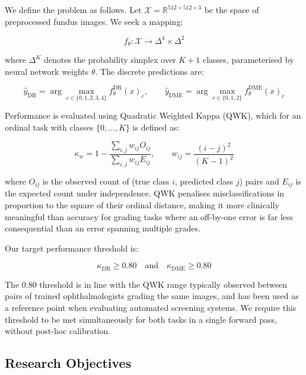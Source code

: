 \documentclass[12pt,a4paper]{article}
\begin{document}
We define the problem as follows. Let $\mathcal{X} = \mathbb{R}^{512 \times 512 \times 3}$ be the space of preprocessed fundus images. We seek a mapping:

\begin{equation}
f_\theta : \mathcal{X} \rightarrow \Delta^4 \times \Delta^2
\end{equation}

where $\Delta^K$ denotes the probability simplex over $K+1$ classes, parameterised by neural network weights $\theta$. The discrete predictions are:

\begin{equation}
\hat{y}_{\text{DR}} = \arg\max_{c \in \{0,1,2,3,4\}} f_\theta^{\text{DR}}(x)_c, \qquad \hat{y}_{\text{DME}} = \arg\max_{c \in \{0,1,2\}} f_\theta^{\text{DME}}(x)_c
\end{equation}

Performance is evaluated using Quadratic Weighted Kappa (QWK), which for an ordinal task with classes $\{0, \ldots, K\}$ is defined as:

\begin{equation}
\kappa_w = 1 - \frac{\sum_{i,j} w_{ij} O_{ij}}{\sum_{i,j} w_{ij} E_{ij}}, \qquad w_{ij} = \frac{(i-j)^2}{(K-1)^2}
\end{equation}

where $O_{ij}$ is the observed count of (true class $i$, predicted class $j$) pairs and $E_{ij}$ is the expected count under independence. QWK penalises misclassifications in proportion to the square of their ordinal distance, making it more clinically meaningful than accuracy for grading tasks where an off-by-one error is far less consequential than an error spanning multiple grades.

Our target performance threshold is:

\begin{equation}
\kappa_{\text{DR}} \geq 0.80 \quad \text{and} \quad \kappa_{\text{DME}} \geq 0.80
\end{equation}

The 0.80 threshold is in line with the QWK range typically observed between pairs of trained ophthalmologists grading the same images, and has been used as a reference point when evaluating automated screening systems. We require this threshold to be met simultaneously for both tasks in a single forward pass, without post-hoc calibration.
\newpage
\subsection{Research Objectives}
\end{document}
